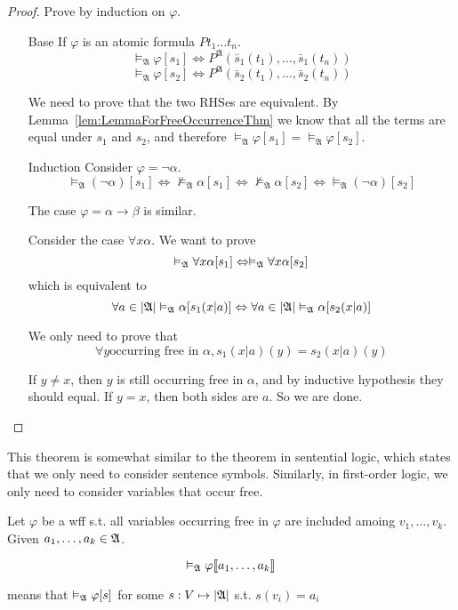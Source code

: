 \begin{proof}
    Prove by induction on $\varphi$.
    \begin{itemize}
        \item[Base] If $\varphi$ is an atomic formula $Pt_1\dots t_n$.
        \[ \vDash_{\mathfrak{A}} \varphi [s_1] \Leftrightarrow P^{\mathfrak{A}}(\bar{s}_1(t_1),\dots,\bar{s}_1(t_n)) \]
        \[ \vDash_{\mathfrak{A}} \varphi [s_2] \Leftrightarrow P^{\mathfrak{A}}(\bar{s}_2(t_1),\dots,\bar{s}_2(t_n)) \]

        We need to prove that the two RHSes are equivalent. By Lemma~\ref{lem:LemmaForFreeOccurrenceThm} we know that all the terms are equal under $s_1$ and $s_2$, and therefore $\vDash_{\mathfrak{A}} \varphi [s_1] = \vDash_{\mathfrak{A}} \varphi [s_2]$.

        \item[Induction] Consider $\varphi=\neg\alpha$.
        \[ \vDash_{\mathfrak{A}}(\neg\alpha)[s_1] \Leftrightarrow \nvDash_{\mathfrak{A}}\alpha[s_1] \Leftrightarrow \nvDash_{\mathfrak{A}}\alpha[s_2] \Leftrightarrow \vDash_{\mathfrak{A}}(\neg\alpha)[s_2] \]

        The case $\varphi = \alpha\to\beta$ is similar.

        Consider the case $\forall x \alpha$. We want to prove
        \[ \vDash_{\mathfrak{A}}\forall x\alpha[s_1] \Leftrightarrow \vDash_{\mathfrak{A}}\forall x\alpha[s_2] \]
        which is equivalent to
        \[ \forall a\in|\mathfrak{A}|\vDash_{\mathfrak{A}}\alpha[s_1(x|a)] \Leftrightarrow \forall a \in |\mathfrak{A}| \vDash_{\mathfrak{A}}\alpha[s_2(x|a)] \]

        We only need to prove that
        \[ \forall y \text{occurring free in $\alpha$}, s_1(x|a)(y) = s_2(x|a)(y) \]

        If $y\neq x$, then $y$ is still occurring free in $\alpha$, and by inductive hypothesis they should equal. If $y=x$, then both sides are $a$. So we are done.
    \end{itemize}
\end{proof}
\begin{remark}
    This theorem is somewhat similar to the theorem in sentential logic, which states that we only need to consider sentence symbols. Similarly, in first-order logic, we only need to consider variables that occur free.
\end{remark}

\begin{definition}
    Let $\varphi$ be a wff s.t. all variables occurring free in $\varphi$ are included amoing $v_1,\dots,v_k$. Given $a_1,\dots,a_k\in\mathfrak{A}$.

    \[ \vDash_{\mathfrak{A}}\varphi\llbracket a_1,\dots,a_k\rrbracket \]

    means that $\vDash_{\mathfrak{A}}\varphi[s]$ for some $s:V\mapsto|\mathfrak{A}|$ s.t. $s(v_i) = a_i$
\end{definition}

